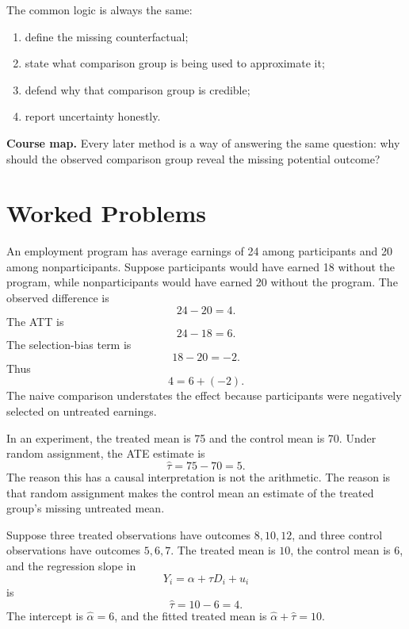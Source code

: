 The common logic is always the same:
\begin{enumerate}
    \item define the missing counterfactual;
    \item state what comparison group is being used to approximate it;
    \item defend why that comparison group is credible;
    \item report uncertainty honestly.
\end{enumerate}

\begin{boxD}
\textbf{Course map.} Every later method is a way of answering the same
question: why should the observed comparison group reveal the missing potential
outcome?
\end{boxD}

\section{Worked Problems}

\begin{exmp}
An employment program has average earnings of 24 among participants and 20 among
nonparticipants. Suppose participants would have earned 18 without the program,
while nonparticipants would have earned 20 without the program. The observed
difference is
\[
    24-20=4.
\]
The ATT is
\[
    24-18=6.
\]
The selection-bias term is
\[
    18-20=-2.
\]
Thus
\[
    4=6+(-2).
\]
The naive comparison understates the effect because participants were negatively
selected on untreated earnings.
\end{exmp}

\begin{exmp}
In an experiment, the treated mean is 75 and the control mean is 70. Under
random assignment, the ATE estimate is
\[
    \hat{\tau}=75-70=5.
\]
The reason this has a causal interpretation is not the arithmetic. The reason is
that random assignment makes the control mean an estimate of the treated group's
missing untreated mean.
\end{exmp}

\begin{exmp}
Suppose three treated observations have outcomes \(8,10,12\), and three control
observations have outcomes \(5,6,7\). The treated mean is \(10\), the control
mean is \(6\), and the regression slope in
\[
    Y_i=\alpha+\tau D_i+u_i
\]
is
\[
    \hat{\tau}=10-6=4.
\]
The intercept is \(\hat{\alpha}=6\), and the fitted treated mean is
\(\hat{\alpha}+\hat{\tau}=10\).
\end{exmp}

